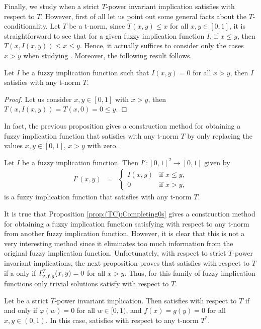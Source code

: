 Finally, we study when a strict $T$-power invariant implication satisfies \TC with respect to $T$. However, first of all let us point out some general facts about the $T$-conditionality. Let $T$ be a t-norm, since $T(x,y) \leq x$ for all $x,y \in [0,1]$, it is straightforward to see that for a given fuzzy implication function $I$, if $x \leq y$, then $T(x,I(x,y))\leq x \leq y$. Hence, it actually suffices to consider only the cases $x>y$ when studying \TC. Moreover, the following result follows.
\begin{proposition}\label{prop:(TC)&LowTrianZero}
	Let $I$ be a fuzzy implication function such that $I(x,y)=0$ for all $x>y$, then $I$ satisfies \TC with any t-norm $T$.
\end{proposition}
\begin{proof}
	Let us consider $x,y \in [0,1]$ with $x>y$, then $T(x,I(x,y))=T(x,0)=0 \leq y$.
\end{proof}
In fact, the previous proposition gives a construction method for obtaining a fuzzy implication function that satisfies \TC with any t-norm $T$ by only replacing the values $x,y \in [0,1]$, $x>y$ with zero.
\begin{proposition}\label{prop:(TC):Completing0s}
	Let $I$ be a fuzzy implication function. Then $I':[0,1]^2 \to [0,1]$ given by
	\begin{eqnarray*}
		I'(x,y) 
		&=&
		\left\{ \begin{array}{ll}
			I(x,y) & \text{if } x \leq y,\\
			0 	   & \text{if }   x>y,			
		\end{array}
		\right.
	\end{eqnarray*}
	is a fuzzy implication function that satisfies \TC with any t-norm $T$.
\end{proposition}
It is true that Proposition \ref{prop:(TC):Completing0s} gives a construction method for obtaining a fuzzy implication function satisfying \TC with respect to any t-norm from another fuzzy implication function. However, it is clear that this is not a very interesting method since it eliminates too much information from the original fuzzy implication function. Unfortunately, with respect to strict $T$-power invariant implications, the next proposition proves that \IT satisfies \TC with respect to $T$ if a only if $I^T_{\varphi,f,g}(x,y)=0$ for all $x >y$. Thus, for this family of fuzzy implication functions only trivial solutions satisfy \TC with respect to $T$.
\begin{proposition}\label{prop:strict:(TC)}
	Let \IT be a strict $T$-power invariant implication. Then \IT satisfies  \TC with respect to $T$ if and only if $\varphi(w)=0$ for all $w \in [0,1)$, and $f(x)=g(y)=0$ for all $x,y \in (0,1)$. In this case, \IT satisfies \TC with respect to any t-norm $T^*$.
\end{proposition}
